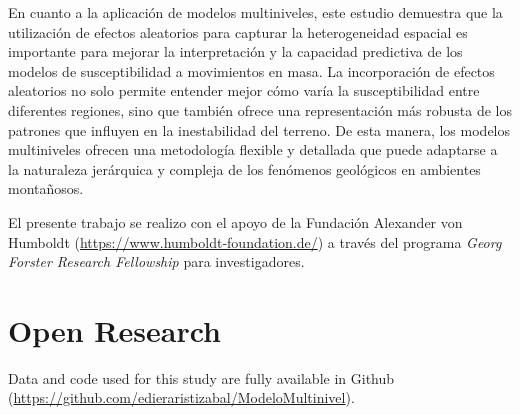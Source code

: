 \documentclass[
  manuscript=article,  
  layout=preprint,  
]{format}
\begin{document}
En cuanto a la aplicación de modelos multiniveles, este estudio demuestra que la utilización de efectos aleatorios para capturar la heterogeneidad espacial es importante para mejorar la interpretación y la capacidad predictiva de los modelos de susceptibilidad a movimientos en masa. La incorporación de efectos aleatorios no solo permite entender mejor cómo varía la susceptibilidad entre diferentes regiones, sino que también ofrece una representación más robusta de los patrones que influyen en la inestabilidad del terreno. De esta manera, los modelos multiniveles ofrecen una metodología flexible y detallada que puede adaptarse a la naturaleza jerárquica y compleja de los fenómenos geológicos en ambientes montañosos.

\begin{acknowledgement}
El presente trabajo se realizo con el apoyo de la Fundación Alexander von Humboldt (\url{https://www.humboldt-foundation.de/}) a través del programa \textit{Georg Forster Research Fellowship} para investigadores.
\end{acknowledgement}

\section{Open Research}
Data and code used for this study are fully available in Github (\url{https://github.com/edieraristizabal/ModeloMultinivel}).

\printbibliography
\end{document}
